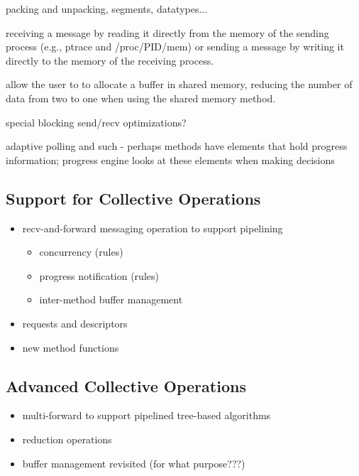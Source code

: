 packing and unpacking, segments, datatypes...

receiving a message by reading it directly from the memory of the
sending process (e.g., ptrace and /proc/PID/mem) or sending a message
by writing it directly to the memory of the receiving process.

allow the user to  to allocate a buffer in shared
memory, reducing the number of data from two to one when using the
shared memory method.

special blocking send/recv optimizations?

adaptive polling and such
- perhaps methods have elements that hold progress information; progress 
  engine looks at these elements when making decisions


\subsection{Support for Collective Operations}

\begin{itemize}
\item recv-and-forward messaging operation to support pipelining
  \begin{itemize}
  \item concurrency (rules)
  \item progress notification (rules)
  \item inter-method buffer management
  \end{itemize}
\item requests and descriptors
\item new method functions
\end{itemize}


\subsection{Advanced Collective Operations}

\begin{itemize}
\item multi-forward to support pipelined tree-based algorithms
\item reduction operations
\item buffer management revisited (for what purpose???)
\end{itemize}

